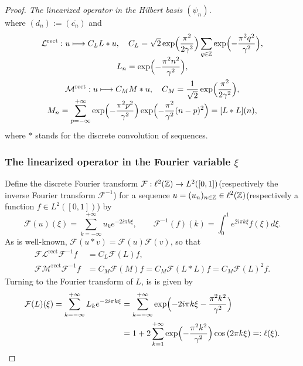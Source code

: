 \documentclass[JEP,XML,SOM,Unicode,NoFloatCountersInSection,published]{cedram}
\newcommand\mto{\mathchoice{\longmapsto}{\mapsto}{\mapsto}{\mapsto}}
\theoremstyle{definition}
\let\EE\exp
\let\dis\relax
\let\ov\overline
\newcommand\Z{\mathbb Z}
\newcommand{\pa}[1]{\left(#1\right)}
\begin{document}
\begin{proof}[Proof. The linearized operator in the Hilbert basis $(\psi_n)$]
\begin{equation*}
\end{equation*}
where $(d_n):= (\ov{c_n})$ and\vspace*{-3pt}
\begin{gather}
\mathcal{L}^{\mathrm{rect}}: u \mto C_L L * u, \quad C_L =\sqrt{2}\EE\Bigl({\frac{\pi^2}{2\gamma^2}}\Bigr)\sum_{q\in\Z}\EE\Bigl(-\frac{\pi^2q^2}{\gamma^2}\Bigr),\notag
\\[-5pt]
\label{def_op_L_rect}
L_n = \EE\Bigl(-\frac{\pi^2n^2}{\gamma^2}\Bigr),
\\
\mathcal{M}^{\mathrm{rect}}: u \mto C_M M * u, \quad C_M =\frac{1}{\sqrt{2}}\EE\Bigl({\frac{\pi^2}{2\gamma^2}}\Bigr),\notag
\\[-5pt]
\label{def_op_M_rect}
M_n = \sum_{p=-\infty}^{+\infty}\EE\Bigl({-\frac{\pi^2p^2}{\gamma^2}}\Bigr) \EE\Bigl({-\frac{\pi^2}{\gamma^2}(n-p)^2}\Bigr) = [L * L](n),
\end{gather} 
where $*$ stands for the discrete convolution of sequences.

\subsubsection*{The linearized operator in the Fourier variable $\xi$}
Define the discrete Fourier transform $\dis \mathcal{F}:\ell^2(\Z) \to L^2([0,1])$(respectively the inverse Fourier transform $\mathcal{F}^{-1}$) for a sequence $\dis u = (u_n)_{n\in\Z} \in \ell^2(\Z)$(respectively a function $f \in L^2([0,1])$) by
\begin{equation}
\label{deffourier}
\mathcal{F}(u)(\xi) = \sum_{k= -\infty}^{+\infty} u_ke^{- 2i\pi k \xi}, \qquad \mathcal{F}^{-1}(f)(k) = \int_0^1 e^{2i\pi k \xi} f(\xi) d\xi.
\end{equation}
As is well-known, $\mathcal{F}(u*v) = \mathcal{F}(u) \mathcal{F}(v)$, so that
\begin{align*}
\mathcal{F}\mathcal{L}^{\mathrm{rect}}\mathcal{F}^{-1}f&=C_L\mathcal{F}(L) f, \\
\mathcal{F}\mathcal{M}^{\mathrm{rect}}\mathcal{F}^{-1}f&=C_M\mathcal{F}(M) f = C_M\mathcal{F}(L*L) f = C_M \mathcal{F}(L)^2 f.
\end{align*}
Turning to the Fourier transform of $L$, is is given by
\begin{equation}\label{def_fct_l}
\begin{aligned}
\mathcal{F}(L)(\xi) = \sum_{k= -\infty}^{+\infty} L_ke^{-{2i\pi k}\xi} &= \sum_{k = -\infty}^{+\infty} \EE\Bigl({-{2i\pi k}\xi-\frac{\pi^2 k^2}{\gamma^2}}\Bigr)\\
&=1 + 2 \sum_{k=1}^{+\infty}\EE\Bigl({-\frac{\pi^2k^2}{\gamma^2}}\Bigr)\cos\pa{2\pi k\xi}=: \ell(\xi).
\end{aligned}
\end{equation}


\end{proof}
\end{document}

